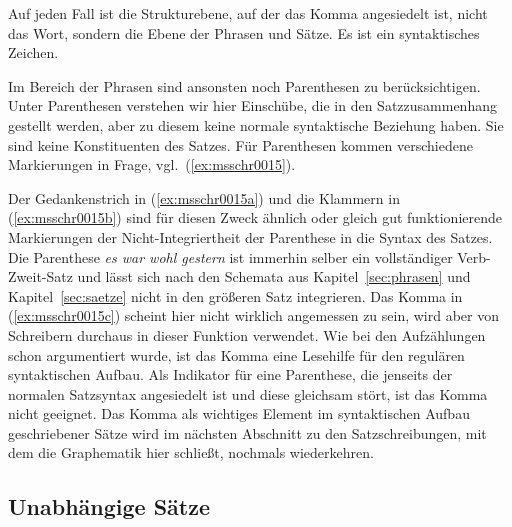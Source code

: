 Auf jeden Fall ist die Strukturebene, auf der das Komma angesiedelt ist, nicht das Wort, sondern die Ebene der Phrasen und Sätze.
Es ist ein syntaktisches Zeichen.


Im Bereich der Phrasen sind ansonsten noch Parenthesen zu berücksichtigen.
Unter Parenthesen verstehen wir hier Einschübe, die in den Satzzusammenhang gestellt werden, aber zu diesem keine normale syntaktische Beziehung haben.
Sie sind keine Konstituenten des Satzes.
Für Parenthesen kommen verschiedene Markierungen in Frage, vgl.\ (\ref{ex:msschr0015}).

\begin{exe}
  \ex\label{ex:msschr0015} 
  \begin{xlist}
  \end{xlist}
\end{exe}

Der Gedankenstrich in (\ref{ex:msschr0015a}) und die Klammern in (\ref{ex:msschr0015b}) sind für diesen Zweck ähnlich oder gleich gut funktionierende Markierungen der Nicht-Integriertheit der Parenthese in die Syntax des Satzes.
Die Parenthese \textit{es war wohl gestern} ist immerhin selber ein vollständiger Verb-Zweit-Satz und lässt sich nach den Schemata aus Kapitel~\ref{sec:phrasen} und Kapitel~\ref{sec:saetze} nicht in den größeren Satz integrieren.
Das Komma in (\ref{ex:msschr0015c}) scheint hier nicht wirklich angemessen zu sein, wird aber von Schreibern durchaus in dieser Funktion verwendet.
Wie bei den Aufzählungen schon argumentiert wurde, ist das Komma eine Lesehilfe für den regulären syntaktischen Aufbau.
Als Indikator für eine Parenthese, die jenseits der normalen Satzsyntax angesiedelt ist und diese gleichsam stört, ist das Komma nicht geeignet.
Das Komma als wichtiges Element im syntaktischen Aufbau geschriebener Sätze wird im nächsten Abschnitt zu den Satzschreibungen, mit dem die Graphematik hier schließt, nochmals wiederkehren.

\subsection{Unabhängige Sätze}

